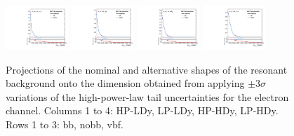 \begin{figure}[htbp]
  \includegraphics[width=0.21\textwidth]{fig/uncertainties/systs_res_e_HP_vbf_LDy_MVVTail_ProjX.pdf}
  \includegraphics[width=0.21\textwidth]{fig/uncertainties/systs_res_e_LP_vbf_LDy_MVVTail_ProjX.pdf}
  \includegraphics[width=0.21\textwidth]{fig/uncertainties/systs_res_e_HP_vbf_HDy_MVVTail_ProjX.pdf}
  \includegraphics[width=0.21\textwidth]{fig/uncertainties/systs_res_e_LP_vbf_HDy_MVVTail_ProjX.pdf}\\
  \caption{
    Projections of the nominal and alternative shapes of the resonant background onto the \MVV dimension obtained from applying $\pm3\sigma$ variations of the high-\MVV power-law tail uncertainties for the electron channel.
    Columns 1 to 4: HP-LDy, LP-LDy, HP-HDy, LP-HDy.
    Rows 1 to 3: bb, nobb, vbf.
  }
  \label{fig:systResMVV_MVVTail}
\end{figure}

